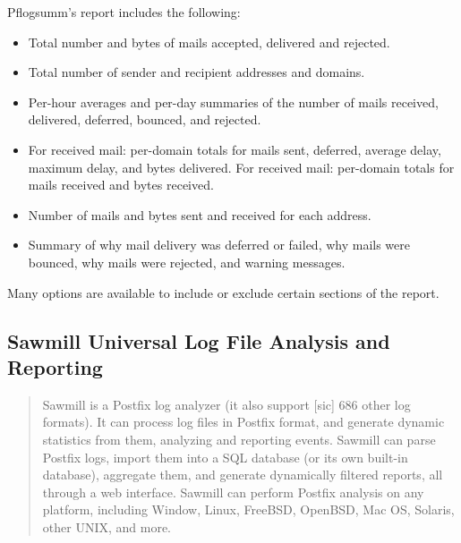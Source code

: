 Pflogsumm's report includes the following:

\begin{itemize}

    \item Total number and bytes of mails accepted, delivered and rejected.

    \item Total number of sender and recipient addresses and domains.

    \item Per-hour averages and per-day summaries of the number of mails
        received, delivered, deferred, bounced, and rejected.

    \item For received mail: per-domain totals for mails sent, deferred,
        average delay, maximum delay, and bytes delivered.  For received
        mail: per-domain totals for mails received and bytes received.

    \item Number of mails and bytes sent and received for each address.

    \item Summary of why mail delivery was deferred or failed, why mails
        were bounced, why mails were rejected, and warning messages.

\end{itemize}

Many options are available to include or exclude certain sections of the
report.

\subsection{Sawmill Universal Log File Analysis and Reporting}

\begin{quotation}

    Sawmill is a Postfix log analyzer (it also support [sic] 686 other log
    formats).  It can process log files in Postfix format, and generate
    dynamic statistics from them, analyzing and reporting events.  Sawmill
    can parse Postfix logs, import them into a SQL database (or its own
    built-in database), aggregate them, and generate dynamically filtered
    reports, all through a web interface.  Sawmill can perform Postfix
    analysis on any platform, including Window, Linux, FreeBSD, OpenBSD,
    Mac OS, Solaris, other UNIX, and more.

\end{quotation}


